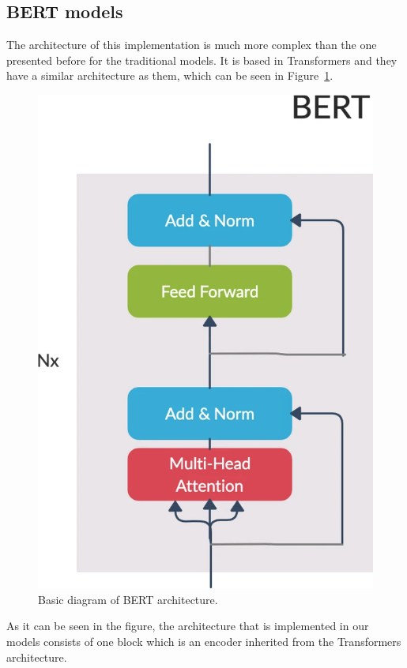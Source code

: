 \subsection{BERT models}
The architecture of this implementation is much more complex than the one presented before for the traditional models. It is based in Transformers and they have a similar architecture as them, which can be seen in Figure~\ref{fig:BERTarchitecture}.

\begin{figure}[!htp]
    \centering
    \includegraphics[scale=0.3]{img/detection/bertarchitecture.png}
    \caption{Basic diagram of BERT architecture.}
    \label{fig:BERTarchitecture}
\end{figure}

As it can be seen in the figure, the architecture that is implemented in our models consists of one block which is an encoder inherited from the Transformers architecture.

